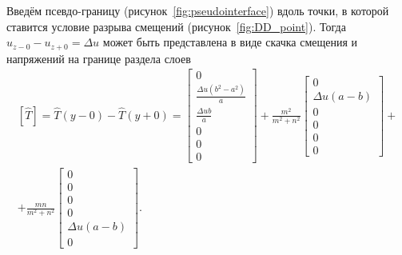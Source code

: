 Введём псевдо-границу (рисунок~\ref{fig:pseudointerface}) вдоль точки, в которой ставится условие разрыва смещений (рисунок~\ref{fig:DD_point}). Тогда $u_{z-0} - u_{z+0} = \Delta u$ может быть представлена в виде скачка смещения и напряжений на границе раздела слоев
\begin{multline}
    \label{eq:jump_condition}
    \left[ \hat{T} \right] = \hat{T}(y-0) - \hat{T}(y+0) = 
    \left[ \begin{array}{c} 
        0 \\ \frac{\Delta u(b^2 - a^2)}{a} \\ \frac{\Delta ub}{a} \\ 0 \\ 0 \\ 0 
    \end{array} \right]
    +
    \frac{m^2}{m^2+n^2} \left[ \begin{array}{c} 
        0 \\ \Delta u(a-b) \\ 0 \\ 0 \\ 0 \\ 0 
    \end{array} \right]
    + \\ +
    \frac{mn}{m^2+n^2} \left[ \begin{array}{c} 
        0 \\ 0 \\ 0 \\ 0 \\ \Delta u(a-b) \\ 0 
    \end{array} \right].
\end{multline}

